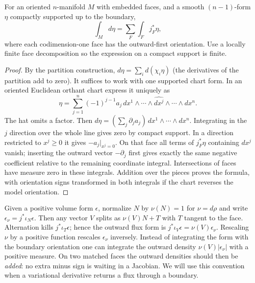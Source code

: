 \begin{theorem}[Stokes]\label{f:stokes}
For an oriented $n$-manifold $M$ with embedded faces, and a smooth $(n-1)$-form $\eta$ compactly supported up to the boundary,
\[
 \int_M d\eta=\sum_F\int_F j_F^*\eta ,
\]
where each codimension-one face has the outward-first orientation. Use a locally finite face decomposition so the expression on a compact support is finite.
\end{theorem}
\begin{proof}
By the partition construction, $d\eta=\sum_i d(\chi_i\eta)$ (the derivatives of the partition add to zero). It suffices to work with one supported chart form. In an oriented Euclidean orthant chart express it uniquely as
\[
 \eta=\sum_{j=1}^n(-1)^{j-1}a_j\,dx^1\wedge\cdots\wedge\widehat{dx^j}\wedge\cdots\wedge dx^n .
\]
The hat omits a factor. Then $d\eta=(\sum_j\partial_j a_j)\,dx^1\wedge\cdots\wedge dx^n$. Integrating in the $j$ direction over the whole line gives zero by compact support. In a direction restricted to $x^j\ge0$ it gives $-a_j|_{x^j=0}$. On that face all terms of $j_F^*\eta$ containing $dx^j$ vanish; inserting the outward vector $-\partial_j$ first gives exactly the same negative coefficient relative to the remaining coordinate integral. Intersections of faces have measure zero in these integrals. Addition over the pieces proves the formula, with orientation signs transformed in both integrals if the chart reverses the model orientation.
\end{proof}

Given a positive volume form $\epsilon$, normalize $N$ by $\nu(N)=1$ for $\nu=d\rho$ and write $\epsilon_\nu=j^*\iota_N\epsilon$. Then any vector $V$ splits as $\nu(V)N+T$ with $T$ tangent to the face. Alternation kills $j^*\iota_T\epsilon$; hence the outward flux form is $j^*\iota_V\epsilon=\nu(V)\epsilon_\nu$. Rescaling $\nu$ by a positive function rescales $\epsilon_\nu$ inversely. Instead of integrating the form with the boundary orientation one can integrate the outward density $\nu(V)|\epsilon_\nu|$ with a positive measure. On two matched faces the outward densities should then be \emph{added}: no extra minus sign is waiting in a Jacobian. We will use this convention when a variational derivative returns a flux through a boundary.

